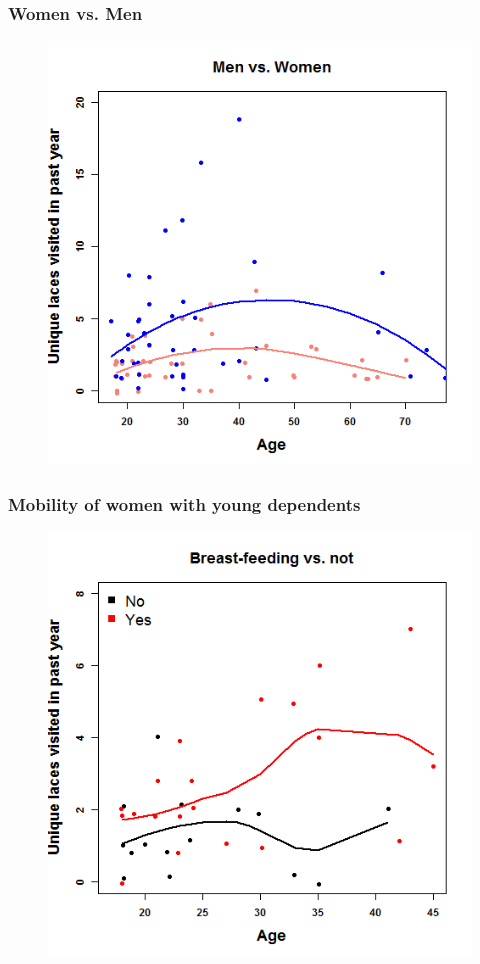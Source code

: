 \documentclass{beamer}
\begin{document}
\begin{frame}
\frametitle{Women vs. Men}
\begin{figure}
\includegraphics[width=0.65\linewidth]{menwom}
\end{figure}
\end{frame}


\begin{frame}
\frametitle{Mobility of women with young dependents}
\begin{figure}
\includegraphics[width=0.65\linewidth]{bfeed_mob}
\end{figure}
\end{frame}



\end{document}
